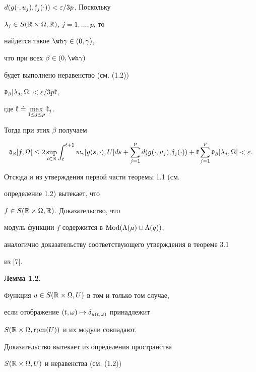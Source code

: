 \begin{pf}
$d(g(\cdot,u_{j}),\frak f_{j}(\cdot))<\varepsilon/3p$. Поскольку


$\lambda_{j}\in S(\Bbb R\times\Omega,\Bbb R)$, $j=1,\dotsc,p$, то


найдется такое $\wh\gamma\in(0,\gamma)$,


что при всех $\beta\in(0,\wh\gamma)$


будет выполнено неравенство (см. (1.2))


$\frak d_{\beta}[\lambda_{j},\Omega]<\varepsilon/3p\frak k$,


где $\frak k\doteq \max\limits_{1\le j\le p}\frak k_{j}$.


Тогда при этих $\beta$ получаем


$$


\frak d_{\beta}[f,\Omega]\le 2 \sup\limits_{t\in\Bbb R}\int_{t}^{t+1}


w_{\gamma}[g(s,\cdot),U]ds+\sum_{j=1}^{p}d(g(\cdot,u_{j}),\gf_{j}(\cdot))+


\frak k\sum_{j=1}^{p}\frak d_{\beta}[\lambda_{j},\Omega]<\varepsilon.


$$


Отсюда и из утверждения первой части теоремы 1.1 (см.


определение 1.2) вытекает, что


$f\in S(\Bbb R\times\Omega,\Bbb R)$. Доказательство, что


модуль функции $f$ содержится в $\operatorname{Mod}(\Lambda(\mu)\cup\Lambda(g))$,


аналогично доказательству соответствующего утверждения в теореме 3.1


из [7].


\end{pf}





{\bf Лемма 1.2.} {\it


Функция $u\in S(\Bbb R\times\Omega,U)$ в том и только том случае,


если отображение $(t,\omega)\mapsto \delta_{u(t,\omega)}$ принадлежит


$S(\Bbb R\times\Omega,\operatorname{rpm}(U))$ и их модули совпадают.


}


\medskip





Доказательство вытекает из определения пространства


$S(\Bbb R\times\Omega,U)$ и неравенства (см. (1.2))


